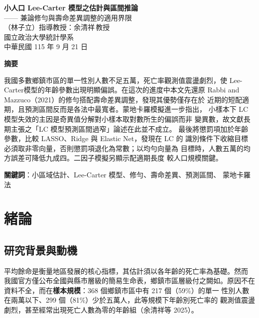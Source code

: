 \documentclass[UTF8, fontset=macnew, a4paper, 12pt]{ctexart}
\begin{document}
\begin{center}
{\bfseries 小人口 Lee-Carter 模型之估計與區間推論}\\[4pt]
{ —— 兼論修勻與壽命差異調整的適用界限}\\[12pt]
{ （林子立）\quad 指導教授：余清祥\,教授}\\[4pt]
{ 國立政治大學統計學系}\\[4pt]
{ 中華民國 115 年 9 月 21 日}
\end{center}

\vspace{6pt}
\begin{center}
\begin{minipage}{0.92\textwidth}
\small
\textbf{摘要}\par\vspace{4pt}
我國多數鄉鎮市區的單一性別人數不足五萬，死亡率觀測值震盪劇烈，使
Lee-Carter模型的年齡參數出現明顯偏誤。在這次的進度中本文先還原
Rabbi and Mazzuco（2021）的修勻搭配壽命差異調整，發現其優勢僅存在於
近期的短配適期，且預測區間反而是各法中最寬者。蒙地卡羅模擬進一步指出，
小樣本下 LC 模型失效的主因是奇異值分解對小樣本取對數所生的偏誤而非
變異數，故文獻長期主張之「LC 模型預測區間過窄」論述在此並不成立。
最後將懲罰項加於年齡參數，比較 LASSO、Ridge 與 Elastic Net，發現在 LC 的
識別條件下收縮目標必須取非零向量，否則懲罰項退化為常數；以均勻向量為
目標時，人數五萬的均方誤差可降低九成四。二因子模擬另顯示配適期長度
較人口規模關鍵。
\par\vspace{6pt}
\textbf{關鍵詞}：小區域估計、Lee-Carter 模型、修勻、壽命差異、預測區間、
蒙地卡羅法
\end{minipage}
\end{center}

\vspace{10pt}

\section{緒論}

\subsection{研究背景與動機}

平均餘命是衡量地區發展的核心指標，其估計須以各年齡的死亡率為基礎。然而
我國官方僅公布全國與縣市層級的簡易生命表，鄉鎮市區層級付之闕如。原因不在
資料不全，而在\textbf{樣本規模}：368 個鄉鎮市區中有 217 個（59\%）的單一
性別人數在兩萬以下、299 個（81\%）少於五萬人，此等規模下年齡別死亡率的
觀測值震盪劇烈，甚至經常出現死亡人數為零的年齡組（余清祥等 2025）。
\end{document}
